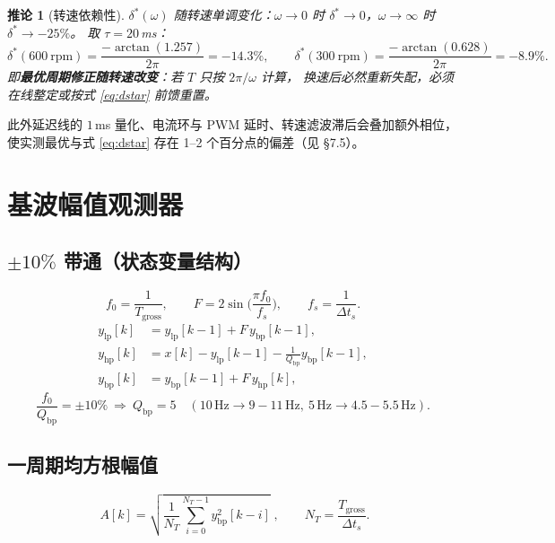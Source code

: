 \documentclass[UTF8,fontset=windows,a4paper,11pt]{ctexart}
\newtheorem{corollary}{推论}
\newcommand{\Tg}{T_{\mathrm{gross}}}
\begin{document}
\begin{corollary}[转速依赖性]
$\delta^{*}(\omega)$ 随转速单调变化：$\omega\to0$ 时 $\delta^{*}\to0$，$\omega\to\infty$ 时 $\delta^{*}\to-25\%$。
取 $\tau=20$\,ms：
\begin{equation}
\delta^{*}(600\ \mathrm{rpm})=\frac{-\arctan(1.257)}{2\pi}=-14.3\%,\qquad
\delta^{*}(300\ \mathrm{rpm})=\frac{-\arctan(0.628)}{2\pi}=-8.9\% .
\end{equation}
即\textbf{最优周期修正随转速改变}：若 $T$ 只按 $2\pi/\omega$ 计算，
换速后必然重新失配，必须在线整定或按式 \eqref{eq:dstar} 前馈重置。
\end{corollary}

此外延迟线的 $1$\,ms 量化、电流环与 PWM 延时、转速滤波滞后会叠加额外相位，
使实测最优与式 \eqref{eq:dstar} 存在 1--2 个百分点的偏差（见 §7.5）。

\section{基波幅值观测器}

\subsection{$\pm10\%$ 带通（状态变量结构）}
\begin{equation}
f_0=\frac{1}{\Tg},\qquad F=2\sin\Big(\frac{\pi f_0}{f_s}\Big),\qquad f_s=\frac{1}{\Delta t_s}.
\end{equation}
\begin{align}
y_{\mathrm{lp}}[k]&=y_{\mathrm{lp}}[k-1]+F\,y_{\mathrm{bp}}[k-1],\\
y_{\mathrm{hp}}[k]&=x[k]-y_{\mathrm{lp}}[k-1]-\frac{1}{Q_{\mathrm{bp}}}y_{\mathrm{bp}}[k-1],\\
y_{\mathrm{bp}}[k]&=y_{\mathrm{bp}}[k-1]+F\,y_{\mathrm{hp}}[k],
\end{align}
\begin{equation}
\frac{f_0}{Q_{\mathrm{bp}}}=\pm10\%\ \Longrightarrow\ Q_{\mathrm{bp}}=5
\quad(10\,\mathrm{Hz}\to 9\!-\!11\,\mathrm{Hz},\ 5\,\mathrm{Hz}\to 4.5\!-\!5.5\,\mathrm{Hz}).
\end{equation}

\subsection{一周期均方根幅值}
\begin{equation}
\boxed{\;A[k]=\sqrt{\frac{1}{N_T}\sum_{i=0}^{N_T-1}y_{\mathrm{bp}}^2[k-i]}\;},
\qquad N_T=\frac{\Tg}{\Delta t_s}.
\label{eq:amp}
\end{equation}
\end{document}
